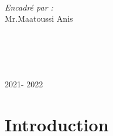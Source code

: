 \documentclass[french]{report}
\begin{document}
\begin{titlepage}
\begin{minipage}{0.4\textwidth}
\begin{flushleft}
\end{flushleft}
\end{minipage}
~
\begin{minipage}{0.4\textwidth}
\begin{flushright} \large
\emph{Encadré par :} \\
Mr.Maatoussi Anis \\%
\\
[0.4cm] \emph{} \\
 \textsc{} %
\\
\end{flushright}
\end{minipage}\\[1cm]


\newline
{\large 2021- 2022}\\[0.9cm] %

\vfill %

\end{titlepage}




\tableofcontents
\thispagestyle{empty}
\listoffigures
\thispagestyle{empty}

\newpage
\setcounter{page}{1} %

\chapter*{Introduction} 
\end{document}
